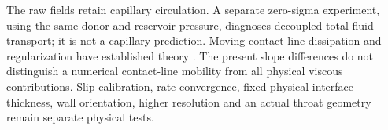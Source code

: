 

The raw fields retain capillary circulation. A separate zero-sigma
experiment, using the same donor and reservoir pressure, diagnoses
decoupled total-fluid transport; it is not a capillary prediction.
Moving-contact-line dissipation and regularization have established
theory \cite{huh1971}. The present slope differences do not distinguish
a numerical contact-line mobility from all physical viscous contributions.
Slip calibration, rate convergence, fixed physical interface thickness,
wall orientation, higher resolution and an actual throat geometry remain
separate physical tests.
